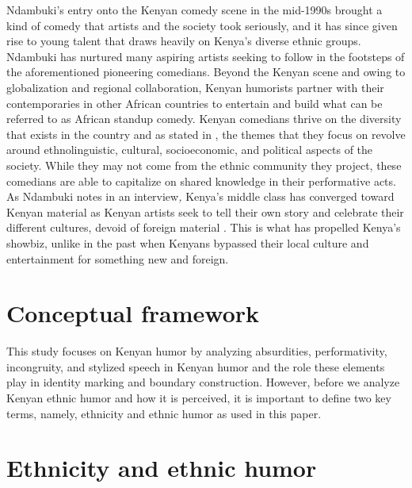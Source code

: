 \documentclass[output=paper]{langsci/langscibook}
\begin{document}
   Ndambuki’s entry onto the Kenyan comedy scene in the mid-1990s brought a kind of comedy that artists and the society took seriously, and it has since given rise to young talent that draws heavily on Kenya’s diverse ethnic groups. Ndambuki has nurtured many aspiring artists seeking to follow in the footsteps of the aforementioned pioneering comedians. Beyond the Kenyan scene and owing to globalization and regional collaboration, Kenyan humorists partner with their contemporaries in other African countries to entertain and build what can be referred to as African standup comedy. Kenyan comedians thrive on the diversity that exists in the country and as stated in , the themes that they focus on revolve around ethnolinguistic, cultural, socioeconomic, and political aspects of the society. While they may not come from the ethnic community they project, these comedians are able to capitalize on shared knowledge in their performative acts. As Ndambuki notes in an interview\textit{, }Kenya’s middle class has converged toward Kenyan material as Kenyan artists seek to tell their own story and celebrate their different cultures, devoid of foreign material \citep{Kimani2014}. This is what has propelled Kenya’s showbiz, unlike in the past when Kenyans bypassed their local culture and entertainment for something new and foreign. 

\section{Conceptual framework}

   This study focuses on Kenyan humor by analyzing absurdities, performativity, incongruity, and stylized speech in Kenyan humor and the role these elements play in identity marking and boundary construction. However, before we analyze Kenyan ethnic humor and how it is perceived, it is important to define two key terms, namely, ethnicity and ethnic humor as used in this paper.

\section{Ethnicity and ethnic humor}
\end{document}
